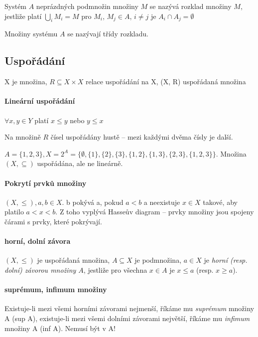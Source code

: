 \documentclass[a4paper, 11pt]{report}
\begin{document}
Systém $A$ neprázdných podmnožin množiny $M$ se nazývá rozklad množiny $M$, jestliže platí $\bigcup_i M_i = M$ pro $M_i$, $M_j \in A$, $i \neq j$ je $A_i \cap A_j = \emptyset$

Množiny systému $A$ se nazývají třídy rozkladu.

\subsection{Uspořádání}

X je množina, $R \subseteq X \times X$ relace uspořádání na X, (X, R) uspořádaná množina

\paragraph{Lineární uspořádání}

$\forall x,y \in Y$ platí $x \leq y$ nebo $y \leq x$

Na množině $R$ čísel uspořádány hustě -- mezi každými dvěma čísly je další.

$A = \{1,2,3\}, X = 2^A = \{\emptyset, \{1\}, \{2\}, \{3\}, \{1, 2\}, \{1, 3\}, \{2, 3\}, \{1, 2, 3\} \}$. Množina $(X, \subseteq)$ uspořádána, ale ne lineárně.

\paragraph{Pokrytí prvků množiny}
$(X, \leq), a,b \in X$. b pokývá a, pokud $a < b$ a neexistuje $x \in X$ takové, aby platilo $a < x < b$. Z toho vyplývá Hasseův diagram -- prvky množiny jsou spojeny čárami s prvky, které pokrývají.

\paragraph{horní, dolní závora}
$(X, \leq)$ je uspořádaná množina, $A \subseteq X$ je podmnožina, $a \in X$ je \emph{horní (resp. dolní) závorou množiny $A$}, jestliže pro všechna $x \in A$ je $x \leq a$ (resp. $x \geq a$).

\paragraph{suprémum, infimum množiny}
Existuje-li mezi všemi horními závorami nejmenší, říkáme mu \emph{suprémum} množiny A (sup A), existuje-li mezi všemi dolními závorami největší, říkáme mu \emph{infimum} množiny A (inf A). Nemusí být v A!
\end{document}
